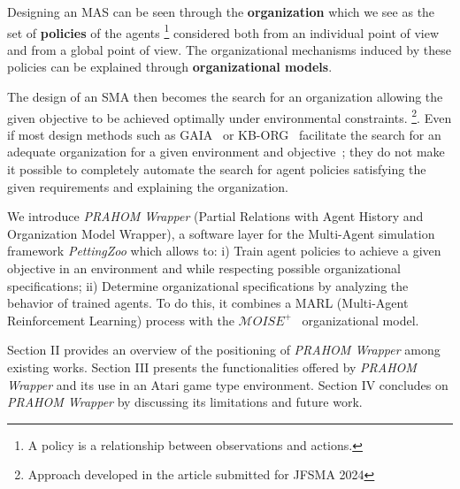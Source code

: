 \documentclass{ecai}
\newcounter{relation}
\begin{document}

Designing an MAS can be seen through the \textbf{organization} which we see as the set of \textbf{policies} of the agents
\footnote{A policy is a relationship between observations and actions.}
considered both from an individual point of view and from a global point of view. The organizational mechanisms induced by these policies can be explained through \textbf{organizational models}.



The design of an SMA then becomes the search for an organization allowing the given objective to be achieved optimally under environmental constraints.
\footnote{Approach developed in the article  submitted for JFSMA 2024 }.
Even if most design methods such as GAIA~\cite{Cernuzzi2014} or KB-ORG~\cite{Sims2008} facilitate the search for an adequate organization for a given environment and objective~\cite{Mefteh2013}; they do not make it possible to completely automate the search for agent policies satisfying the given requirements and explaining the organization.

We introduce \emph{PRAHOM Wrapper} (Partial Relations with Agent History and Organization Model Wrapper), a software layer for the Multi-Agent simulation framework \emph{PettingZoo} which allows to:
%
i) Train agent policies to achieve a given objective in an environment and while respecting possible organizational specifications;\quad
ii) Determine organizational specifications %
by analyzing the behavior of trained agents.
%
To do this, it combines a MARL (Multi-Agent Reinforcement Learning) process with the $\mathcal{M}OISE^+$~\cite{Hubner2007} organizational model.

Section II provides an overview of the positioning of \emph{PRAHOM Wrapper} among existing works.
Section III presents the functionalities offered by \emph{PRAHOM Wrapper} and its use in an Atari game type environment.
Section IV concludes on \emph{PRAHOM Wrapper} by discussing its limitations and future work.
\end{document}
